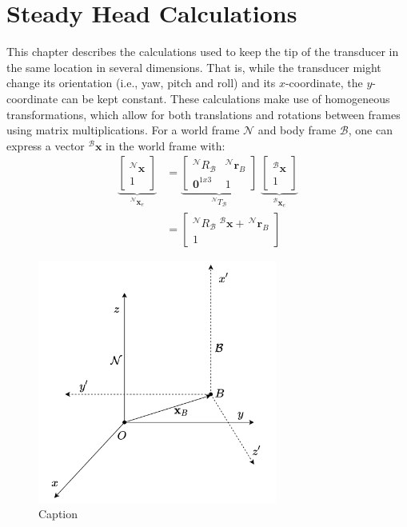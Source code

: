 \chapter{Steady Head Calculations}
\label{chap:SHC}
This chapter describes the calculations used to keep the tip of the transducer in the same location in several dimensions. That is, while the transducer might change its orientation (i.e., yaw, pitch and roll) and its $x$-coordinate, the $y$-coordinate can be kept constant. These calculations make use of homogeneous transformations, which allow for both translations and rotations between frames using matrix multiplications. For a world frame $\mathcal{N}$ and body frame $\mathcal{B}$, one can express a vector $^\mathcal{B}\mathbf{x}$ in the world frame with:
\begin{align}
    \underbrace{\left[\begin{array}{r} ^\mathcal{N}\mathbf{x}  \\ 1 \end{array}\right]}_{^\mathcal{N}\mathbf{x}_e}  &= \underbrace{\left[ \begin{array}{cc} ^\mathcal{N}R_\mathcal{B} &  ^\mathcal{N}\mathbf{r}_{B} \\ \mathbf{0}^{1x3} & 1 \end{array}  \right]}_{^\mathcal{N}T_\mathcal{B}} \; \underbrace{\left[\begin{array}{r} ^\mathcal{B}\mathbf{x}  \\ 1 \end{array}\right]}_{^\mathcal{B}\mathbf{x}_e} \label{eq: homTrans}\\
    &= \left[ \begin{array}{c}
         ^\mathcal{N}R_\mathcal{B}\; ^\mathcal{B}\mathbf{x} +\,  ^\mathcal{N}\mathbf{r}_{B} \\
         1
    \end{array} \right] \nonumber
\end{align}

\begin{figure}
    \centering
    \includegraphics[width=0.7\textwidth]{figures/SteadyHeadCalculations/SHC_transf.png}
    \caption{Caption}
    \label{fig:my_label}
\end{figure}

% 
% 